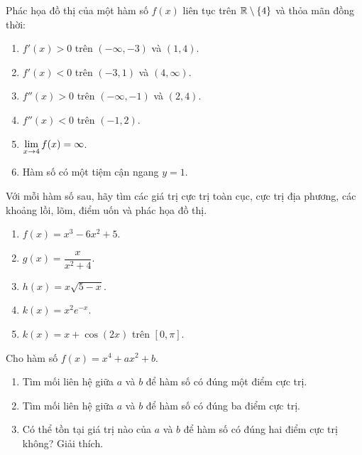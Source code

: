 \begin{exercise}
Phác họa đồ thị của một hàm số $f(x)$ liên tục trên $\mathbb{R} \setminus \{4\}$ và thỏa mãn đồng thời:
\begin{enumerate}[label=(\alph*)]
    \item $f'(x) > 0$ trên $(-\infty, -3)$ và $(1, 4)$.
    \item $f'(x) < 0$ trên $(-3, 1)$ và $(4, \infty)$.
    \item $f''(x) > 0$ trên $(-\infty, -1)$ và $(2, 4)$.
    \item $f''(x) < 0$ trên $(-1, 2)$.
    \item $\lim\limits_{x \to 4} f(x) = \infty$.
    \item Hàm số có một tiệm cận ngang $y=1$.
\end{enumerate}
\end{exercise}

\begin{exercise}
Với mỗi hàm số sau, hãy tìm các giá trị cực trị toàn cục, cực trị địa phương, các khoảng lồi, lõm, điểm uốn và phác họa đồ thị.
\begin{enumerate}[label=(\alph*)]
    \item $f(x) = x^3 - 6x^2 + 5$.
    \item $g(x) = \dfrac{x}{x^2+4}$.
    \item $h(x) = x\sqrt{5-x}$.
    \item $k(x) = x^2 e^{-x}$.
    \item $k(x) = x + \cos(2x)$ trên $[0, \pi]$.
\end{enumerate}
\end{exercise}

\begin{exercise}
Cho hàm số $f(x) = x^4 + ax^2 + b$.
\begin{enumerate}[label=(\alph*)]
    \item Tìm mối liên hệ giữa $a$ và $b$ để hàm số có đúng một điểm cực trị.
    \item Tìm mối liên hệ giữa $a$ và $b$ để hàm số có đúng ba điểm cực trị.
    \item Có thể tồn tại giá trị nào của $a$ và $b$ để hàm số có đúng hai điểm cực trị không? Giải thích.
\end{enumerate}
\end{exercise}


